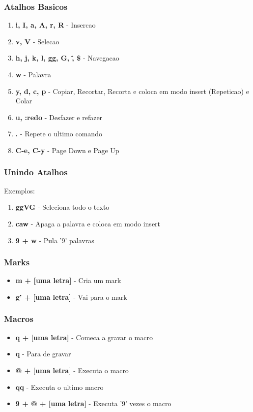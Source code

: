 \documentclass[aspectratio=169]{beamer}
\begin{document}
\begin{frame}\frametitle{Atalhos Basicos}
    \begin{enumerate}
        \item <1-> \textbf{i, I, a, A, r, R} - Insercao
        \item <2-> \textbf{v, V} - Selecao
        \item <3-> \textbf{h, j, k, l, gg, G, \^, \$} - Navegacao
        \item <4-> \textbf{w} - Palavra
        \item <5-> \textbf{y, d, c, p} - Copiar, Recortar, Recorta e coloca em modo insert (Repeticao) e Colar
        \item <6-> \textbf{u, :redo} - Desfazer e refazer
        \item <7-> \textbf{.} - Repete o ultimo comando
        \item <8-> \textbf{C-e, C-y} - Page Down e Page Up
    \end{enumerate}
\end{frame}

\begin{frame}\frametitle{Unindo Atalhos}
    Exemplos:
    \begin{enumerate}
        \item <1-> \textbf{ggVG} - Seleciona todo o texto
        \item <2-> \textbf{caw} - Apaga a palavra e coloca em modo insert
        \item <3-> \textbf{9 + w} - Pula '9' palavras
    \end{enumerate}
\end{frame}

\begin{frame}\frametitle{Marks}
    \begin{itemize}
        \item \textbf{m + [uma letra]} - Cria um mark
        \item \textbf{g' + [uma letra]} - Vai para o mark
    \end{itemize}
\end{frame}

\begin{frame}\frametitle{Macros}
    \begin{itemize}
        \item \textbf{q + [uma letra]} - Comeca a gravar o macro
        \item \textbf{q} - Para de gravar
        \item \textbf{@ + [uma letra]} - Executa o macro
        \item \textbf{qq} - Executa o ultimo macro
        \item \textbf{9 + @ + [uma letra]} - Executa '9' vezes o macro
    \end{itemize}
\end{frame}
\end{document}
